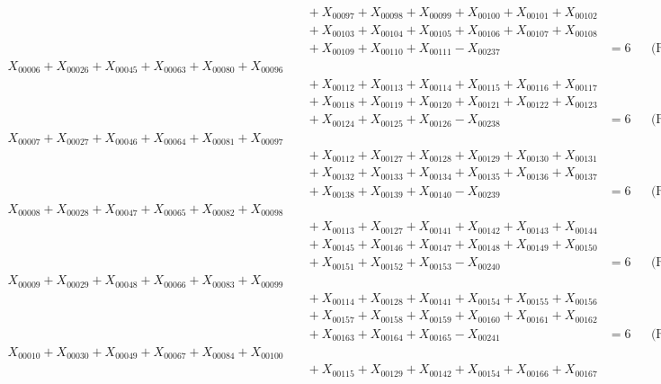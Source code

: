 \documentclass[a4paper,10pt]{article}
\begin{document}
{\begin{align}
&\quad  + X_{00097} + X_{00098} + X_{00099} + X_{00100} + X_{00101} + X_{00102} \\[0.5ex]
&\quad  + X_{00103} + X_{00104} + X_{00105} + X_{00106} + X_{00107} + X_{00108} \\[0.5ex]
&\quad  + X_{00109} + X_{00110} + X_{00111} - X_{00237} &= 6 && \text{(R00006)} \\
X_{00006} + X_{00026} + X_{00045} + X_{00063} + X_{00080} + X_{00096} \\[0.5ex]
&\quad  + X_{00112} + X_{00113} + X_{00114} + X_{00115} + X_{00116} + X_{00117} \\[0.5ex]
&\quad  + X_{00118} + X_{00119} + X_{00120} + X_{00121} + X_{00122} + X_{00123} \\[0.5ex]
&\quad  + X_{00124} + X_{00125} + X_{00126} - X_{00238} &= 6 && \text{(R00007)} \\
X_{00007} + X_{00027} + X_{00046} + X_{00064} + X_{00081} + X_{00097} \\[0.5ex]
&\quad  + X_{00112} + X_{00127} + X_{00128} + X_{00129} + X_{00130} + X_{00131} \\[0.5ex]
&\quad  + X_{00132} + X_{00133} + X_{00134} + X_{00135} + X_{00136} + X_{00137} \\[0.5ex]
&\quad  + X_{00138} + X_{00139} + X_{00140} - X_{00239} &= 6 && \text{(R00008)} \\
X_{00008} + X_{00028} + X_{00047} + X_{00065} + X_{00082} + X_{00098} \\[0.5ex]
&\quad  + X_{00113} + X_{00127} + X_{00141} + X_{00142} + X_{00143} + X_{00144} \\[0.5ex]
&\quad  + X_{00145} + X_{00146} + X_{00147} + X_{00148} + X_{00149} + X_{00150} \\[0.5ex]
&\quad  + X_{00151} + X_{00152} + X_{00153} - X_{00240} &= 6 && \text{(R00009)} \\
X_{00009} + X_{00029} + X_{00048} + X_{00066} + X_{00083} + X_{00099} \\[0.5ex]
&\quad  + X_{00114} + X_{00128} + X_{00141} + X_{00154} + X_{00155} + X_{00156} \\[0.5ex]
&\quad  + X_{00157} + X_{00158} + X_{00159} + X_{00160} + X_{00161} + X_{00162} \\[0.5ex]
&\quad  + X_{00163} + X_{00164} + X_{00165} - X_{00241} &= 6 && \text{(R00010)} \\
X_{00010} + X_{00030} + X_{00049} + X_{00067} + X_{00084} + X_{00100} \\[0.5ex]
&\quad  + X_{00115} + X_{00129} + X_{00142} + X_{00154} + X_{00166} + X_{00167} \\[0.5ex]

\end{align}}
\end{document}

